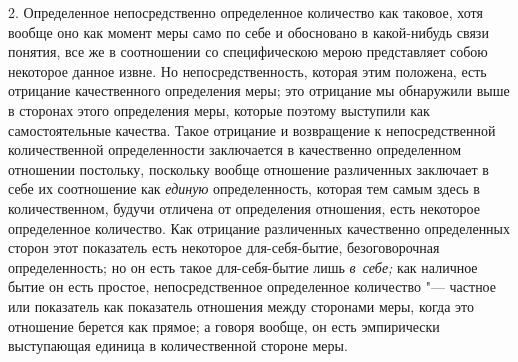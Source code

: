 2. Определенное непосредственно определенное количество как таковое, хотя
вообще оно как момент меры само по себе и обосновано в какой-нибудь связи
понятия, все же в соотношении со специфическою мерою представляет собою
некоторое данное извне. Но непосредственность, которая этим положена, есть
отрицание качественного определения меры; это отрицание мы обнаружили выше в
сторонах этого определения меры, которые поэтому выступили как самостоятельные
качества. Такое отрицание и возвращение к непосредственной количественной
определенности заключается в качественно определенном отношении постольку,
поскольку вообще отношение различенных заключает в себе их соотношение как
{\em единую} определенность, которая тем самым здесь в количественном, будучи
отличена от определения отношения, есть некоторое определенное количество. Как
отрицание различенных качественно определенных сторон этот показатель есть
некоторое для-себя-бытие, безоговорочная определенность; но он есть такое
для-себя-бытие лишь {\em в~себе;} как наличное бытие он есть простое,
непосредственное определенное количество "--- частное или показатель как
показатель отношения между сторонами меры, когда это отношение берется как
прямое; а говоря вообще, он есть эмпирически выступающая единица в
количественной стороне меры.
